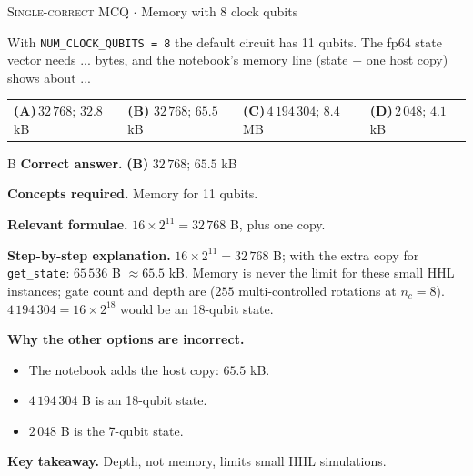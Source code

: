 \documentclass[11pt,a4paper]{article}
\newcommand{\optlabel}[1]{\textbf{(#1)}}
\newcommand{\correctlabel}[1]{\textcolor{okgreen}{\textbf{(#1)}\,\ding{51}}}
\newenvironment{qitem}[1]{\begin{list}{}{\setlength{\leftmargin}{3.3em}\setlength{\labelwidth}{3.1em}%
  \setlength{\labelsep}{0.2em}\setlength{\topsep}{3pt}\setlength{\parsep}{3pt}}\item[\textbf{Q.#1}\hfill]}{\end{list}}
\newcommand{\qsep}{\par\vspace{2pt}{\color{black!15}\hrule}\vspace{4pt}}
\newcommand{\qmeta}[2]{{\footnotesize\color{black!60}\textsc{#1} \;$\cdot$\; #2}\par}
\begin{document}
\begin{qitem}{76}
\qmeta{Single-correct MCQ}{Memory with 8 clock qubits}
With \texttt{NUM\_CLOCK\_QUBITS = 8} the default circuit has 11 qubits. The fp64 state vector needs ... bytes, and the notebook's memory line (state + one host copy) shows about ...
\par\smallskip\noindent\begin{tabularx}{\linewidth}{@{}*{4}{L}@{}}
\optlabel{A}\,$32\,768$; $32.8$ kB & \correctlabel{B}\,$32\,768$; $65.5$ kB & \optlabel{C}\,$4\,194\,304$; $8.4$ MB & \optlabel{D}\,$2\,048$; $4.1$ kB
\end{tabularx}
\end{qitem}
\begin{solbox}{B}
\textbf{\color{brand}Correct answer.} \textcolor{okgreen}{\textbf{(B)}} $32\,768$; $65.5$ kB

\textbf{\color{brand}Concepts required.} Memory for 11 qubits.

\textbf{\color{brand}Relevant formulae.} $16\times2^{11} = 32\,768$ B, plus one copy.

\textbf{\color{brand}Step-by-step explanation.} $16\times2^{11} = 32\,768$ B; with the extra copy for \texttt{get\_state}: $65\,536$ B $\approx 65.5$ kB. Memory is never the limit for these small HHL instances; gate count and depth are
($255$ multi-controlled rotations at $n_c = 8$). $4\,194\,304 = 16\times2^{18}$ would be an 18-qubit state.

\textbf{\color{brand}Why the other options are incorrect.}
\begin{itemize}[leftmargin=2.4em, itemsep=1pt, topsep=2pt]
\item[\textbf{(A)}] The notebook adds the host copy: $65.5$ kB.
\item[\textbf{(C)}] $4\,194\,304$ B is an 18-qubit state.
\item[\textbf{(D)}] $2\,048$ B is the 7-qubit state.
\end{itemize}
\textbf{\color{brand}Key takeaway.} Depth, not memory, limits small HHL simulations.
\end{solbox}
\qsep
\end{document}
